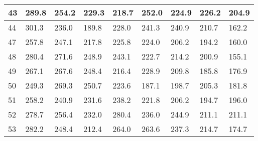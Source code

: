 \documentclass{article}
\begin{document}
\begin{table}[!htbp]
{\begin{tabular}{ |p{3cm}|| p{3cm} | p{3cm} | p{3cm} | p{3cm} | p{3cm} | p{3cm} | p{3cm} | p{3cm}| }
\hline
\small 43\small & 289.8\small & 254.2\small & 229.3\small & 218.7\small & 252.0\small & 224.9\small & 226.2\small & 204.9 \\ 
\hline
\small 44\small & 301.3\small & 236.0\small & 189.8\small & 228.0\small & 241.3\small & 240.9\small & 210.7\small & 162.2 \\ 
\hline
\small 47\small & 257.8\small & 247.1\small & 217.8\small & 225.8\small & 224.0\small & 206.2\small & 194.2\small & 160.0 \\ 
\hline
\small 48\small & 280.4\small & 271.6\small & 248.9\small & 243.1\small & 222.7\small & 214.2\small & 200.9\small & 155.1 \\ 
\hline
\small 49\small & 267.1\small & 267.6\small & 248.4\small & 216.4\small & 228.9\small & 209.8\small & 185.8\small & 176.9 \\ 
\hline
\small 50\small & 249.3\small & 269.3\small & 250.7\small & 223.6\small & 187.1\small & 198.7\small & 205.3\small & 181.8 \\ 
\hline
\small 51\small & 258.2\small & 240.9\small & 231.6\small & 238.2\small & 221.8\small & 206.2\small & 194.7\small & 196.0 \\ 
\hline
\small 52\small & 278.7\small & 256.4\small & 232.0\small & 280.4\small & 236.0\small & 244.9\small & 211.1\small & 211.1 \\ 
\hline
\small 53\small & 282.2\small & 248.4\small & 212.4\small & 264.0\small & 263.6\small & 237.3\small & 214.7\small & 174.7 \\ 
\hline
\end{tabular}%
}
\end{table}
\end{document}
